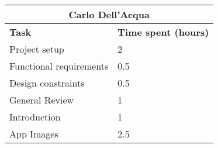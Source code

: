 \begin{table}[h]
  \center
  \begin{tabular}{l|l}
    \multicolumn{2}{c}{\textbf{Carlo Dell'Acqua}} \\
    \hline
    \textbf{Task} & \textbf{Time spent (hours)}\\
    \hline
    Project setup & 2 \\
    Functional requirements & 0.5 \\
    Design constraints & 0.5 \\
    General Review & 1 \\
    Introduction & 1 \\
    App Images & 2.5 \\
  \end{tabular}
\end{table}